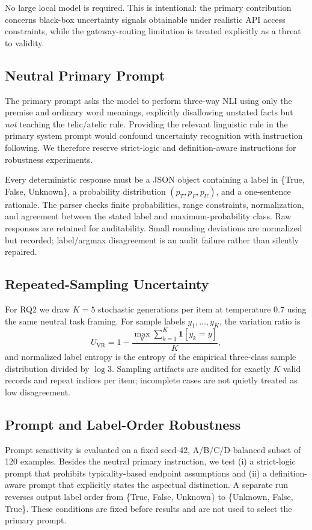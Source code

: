 \documentclass[letterpaper]{article}
\begin{document}
No large local model is required. This is intentional: the primary contribution concerns black-box uncertainty signals obtainable under realistic API access constraints, while the gateway-routing limitation is treated explicitly as a threat to validity.

\subsection{Neutral Primary Prompt}
The primary prompt asks the model to perform three-way NLI using only the premise and ordinary word meanings, explicitly disallowing unstated facts but \emph{not} teaching the telic/atelic rule. Providing the relevant linguistic rule in the primary system prompt would confound uncertainty recognition with instruction following. We therefore reserve strict-logic and definition-aware instructions for robustness experiments.

Every deterministic response must be a JSON object containing a label in \{True, False, Unknown\}, a probability distribution $(p_T,p_F,p_U)$, and a one-sentence rationale. The parser checks finite probabilities, range constraints, normalization, and agreement between the stated label and maximum-probability class. Raw responses are retained for auditability. Small rounding deviations are normalized but recorded; label/argmax disagreement is an audit failure rather than silently repaired.

\subsection{Repeated-Sampling Uncertainty}
For RQ2 we draw $K=5$ stochastic generations per item at temperature 0.7 using the same neutral task framing. For sample labels $y_1,\ldots,y_K$, the variation ratio is
\begin{equation}
U_{\mathrm{VR}}=1-\frac{\max_y \sum_{k=1}^{K}\mathbf{1}[y_k=y]}{K},
\end{equation}
and normalized label entropy is the entropy of the empirical three-class sample distribution divided by $\log 3$. Sampling artifacts are audited for exactly $K$ valid records and repeat indices per item; incomplete cases are not quietly treated as low disagreement.

\subsection{Prompt and Label-Order Robustness}
Prompt sensitivity is evaluated on a fixed seed-42, A/B/C/D-balanced subset of 120 examples. Besides the neutral primary instruction, we test (i) a strict-logic prompt that prohibits typicality-based endpoint assumptions and (ii) a definition-aware prompt that explicitly states the aspectual distinction. A separate run reverses output label order from \{True, False, Unknown\} to \{Unknown, False, True\}. These conditions are fixed before results and are not used to select the primary prompt.
\end{document}
